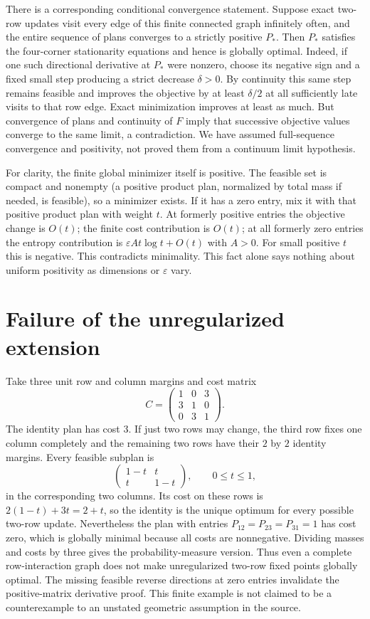 \documentclass[11pt]{article}
\begin{document}
There is a corresponding conditional convergence statement. Suppose
exact two-row updates visit every edge of this finite connected
graph infinitely often, and the entire sequence of plans converges
to a strictly positive $P_*$. Then $P_*$ satisfies the four-corner
stationarity equations and hence is globally optimal. Indeed, if
one such directional derivative at $P_*$ were nonzero, choose its
negative sign and a fixed small step producing a strict decrease
$\delta>0$. By continuity this same step remains feasible and
improves the objective by at least $\delta/2$ at all sufficiently
late visits to that row edge. Exact minimization improves at least
as much. But convergence of plans and continuity of $F$ imply that
successive objective values converge to the same limit, a
contradiction. We have assumed full-sequence convergence and
positivity, not proved them from a continuum limit hypothesis.

For clarity, the finite global minimizer itself is positive.
The feasible set is compact and nonempty (a positive product plan,
normalized by total mass if needed, is feasible), so a minimizer
exists. If it has a zero entry, mix it with that positive product
plan with weight $t$. At formerly positive entries the objective
change is $O(t)$; the finite cost contribution is $O(t)$; at all
formerly zero entries the entropy contribution is
$\varepsilon A t\log t+O(t)$ with $A>0$. For small positive $t$
this is negative. This contradicts minimality. This fact alone
says nothing about uniform positivity as dimensions or
$\varepsilon$ vary.

\section{Failure of the unregularized extension}
Take three unit row and column margins and cost matrix
\[
 C=\begin{pmatrix}1&0&3\\3&1&0\\0&3&1\end{pmatrix}.
\]
The identity plan has cost $3$. If just two rows may change, the
third row fixes one column completely and the remaining two rows
have their $2$ by $2$ identity margins. Every feasible subplan is
\[
 \begin{pmatrix}1-t&t\\t&1-t\end{pmatrix},\qquad 0\le t\le1,
\]
in the corresponding two columns. Its cost on these rows is
$2(1-t)+3t=2+t$, so the identity is the unique optimum for every
possible two-row update. Nevertheless the plan with entries
$P_{12}=P_{23}=P_{31}=1$ has cost zero, which is globally minimal
because all costs are nonnegative. Dividing masses and costs by
three gives the probability-measure version. Thus even a complete
row-interaction graph does not make unregularized two-row fixed
points globally optimal. The missing feasible reverse directions
at zero entries invalidate the positive-matrix derivative proof.
This finite example is not claimed to be a counterexample to an
unstated geometric assumption in the source.
\end{document}
